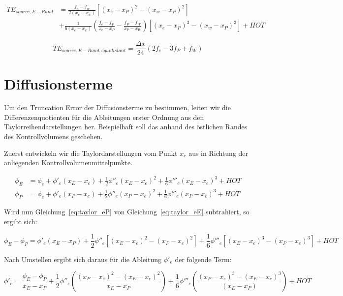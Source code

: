 \documentclass[10pt, ngerman,colorback,accentcolor=tud2d]{tudreport}
\begin{document}
\begin{align}
  TE_{source, E-Rand} &=
 \frac{f_e-f_w}{2(x_e-x_w)}  \left[{(x_e-x_P)^2-(x_w-x_P)^2}\right]\nonumber\\
&+\frac{1}{6(x_e-x_w)}\left(\frac{f_e-f_P}{x_e-x_P}-\frac{f_P-f_W}{x_P-x_W}\right)
  \left[{{(x_e-x_P)}^3-{(x_w-x_P)}^3}\right] + HOT
\end{align}

\begin{equation*}
  TE_{source, E-Rand, äquidistant} = \frac{\Delta x}{24} \left({2f_e-3f_P+f_W}\right)
\end{equation*}





\section{Diffusionsterme}
\label{sec:Diffusionsterme}


Um den Truncation Error der Diffusionsterme zu bestimmen, leiten wir die Differenzenquotienten
für die Ableitungen erster Ordnung aus den Taylorreihendarstellungen her. Beispielhaft
soll das anhand des östlichen Randes des Kontrollvolumens geschehen.

Zuerst entwickeln wir die Taylordarstellungen vom Punkt $x_e$ aus in Richtung der anliegenden
Kontrollvolumenmittelpunkte.

\begin{align}
  \phi_E &= \phi_e + \phi'_e(x_E-x_e)+\frac{1}{2}\phi''_e(x_E-x_e)^2
  +\frac{1}{6}\phi'''_e(x_E-x_e)^3+HOT
  \label{eq:taylor_eE}\\
  \phi_P &= \phi_e + \phi'_e(x_P-x_e)+\frac{1}{2}\phi''_e(x_P-x_e)^2
  +\frac{1}{6}\phi'''_e(x_P-x_e)^3+HOT
  \label{eq:taylor_eP}
\end{align}

Wird nun Gleichung~\eqref{eq:taylor_eP} von Gleichung~\eqref{eq:taylor_eE} subtrahiert, 
so ergibt sich:

\begin{equation*}
  \phi_E-\phi_P=\phi'_e(x_E-x_P)+
  \frac{1}{2}\phi''_e\left[{{(x_E-x_e)}^2-{(x_P-x_e)}^2}\right]+
  \frac{1}{6}\phi'''_e\left[{{(x_E-x_e)}^3-{(x_P-x_e)}^3}\right]+HOT
\end{equation*}

Nach Umstellen ergibt sich daraus für die Ableitung $\phi'_e$ der folgende Term:

\begin{equation}
  \phi'_e = \frac{\phi_E-\phi_P}{x_E-x_P}+\frac{1}{2}\phi''_e
\left({\frac{{(x_P-x_e)}^2-{(x_E-x_e)}^2}{x_E-x_P}}\right)+
\frac{1}{6} \phi'''_e \left({\frac{{(x_P-x_e)}^3-{(x_E-x_e)}^3}{(x_E-x_P)}}\right)+HOT
\end{equation}
\end{document}
